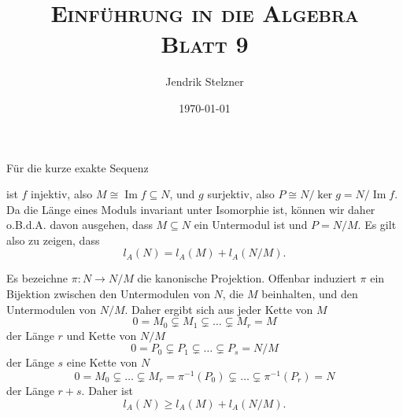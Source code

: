 \documentclass[a4paper,10pt]{article}
\title{\textsc{Einführung in die Algebra \\ \Large Blatt 9}}
\author{Jendrik Stelzner}
\date{\today}
\theoremstyle{definition}
\newcommand{\Img}{\operatorname{Im}}
\begin{document}
\maketitle





\section{}





\section{}





\section{}
Für die kurze exakte Sequenz
\begin{center}
\end{center}
ist $f$ injektiv, also $M \cong \Img f \subseteq N$, und $g$ surjektiv, also $P \cong N / \ker g = N / \Img f$. Da die Länge eines Moduls invariant unter Isomorphie ist, können wir daher o.B.d.A. davon ausgehen, dass $M \subseteq N$ ein Untermodul ist und $P = N/M$. Es gilt also zu zeigen, dass
\[
 l_A(N) = l_A(M) + l_A(N/M).
\]

Es bezeichne $\pi : N \rightarrow N/M$ die kanonische Projektion. Offenbar induziert $\pi$ ein Bijektion zwischen den Untermodulen von $N$, die $M$ beinhalten, und den Untermodulen von $N/M$. Daher ergibt sich aus jeder Kette von $M$
\[
 0 = M_0 \subsetneq M_1 \subsetneq \ldots \subsetneq M_r = M
\]
der Länge $r$ und Kette von $N/M$
\[
 0 = P_0 \subsetneq P_1 \subsetneq \ldots \subsetneq P_s = N/M
\]
der Länge $s$ eine Kette von $N$
\[
 0 = M_0 \subsetneq \ldots \subsetneq M_r = \pi^{-1}(P_0) \subsetneq \ldots \subsetneq \pi^{-1}(P_r) = N
\]
der Länge $r+s$. Daher ist
\[
 l_A(N) \geq l_A(M) + l_A(N/M).
\]
\end{document}
